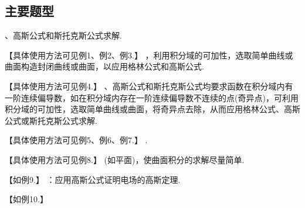 \documentclass[12pt,UTF8,fleqn]{ctexart}
\begin{document}
\subsection{主要题型}
\begin{enumerate}
、高斯公式和斯托克斯公式求解.

【具体使用方法可见例1、例2、例3.】
，利用积分域的可加性，选取简单曲线或曲面构造封闭曲线或曲面，以应用格林公式和高斯公式. 

【具体使用方法可见例4.】
、高斯公式和斯托克斯公式均要求函数在积分域内有一阶连续偏导数，如在积分域内存在一阶连续偏导数不连续的点(奇异点)，可利用积分域的可加性，选取简单曲线或曲面，将奇异点去除，从而应用格林公式、高斯公式或斯托克斯公式求解.  

【具体使用方法可见例5、例6、例7.】
.

【具体使用方法可见例8.】
(如平面)，使曲面积分的求解尽量简单.

【如例9.】
：应用高斯公式证明电场的高斯定理.

【如例10.】
\end{enumerate}
\end{document}
